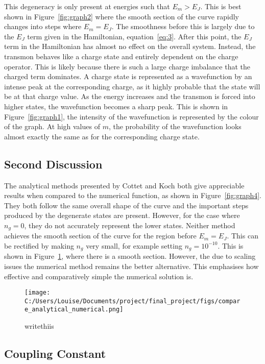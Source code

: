 \documentclass[11pt]{article}
\begin{document}
This degeneracy is only present at energies such that $E_m > E_J$. This is best shown in Figure~\ref{fig:graph2} where the smooth section of the curve rapidly changes into steps where $E_m = E_J$. The smoothness before this is largely due to the $E_J$ term given in the Hamiltonian, equation~\ref{eq:3}. After this point, the $E_J$ term in the Hamiltonian has almost no effect on the overall system. Instead, the transmon behaves like a charge state and entirely dependent on the charge operator. This is likely because there is such a large charge imbalance that the charged term dominates. A charge state is represented as a wavefunction by an intense peak at the corresponding charge, as it highly probable that the state will be at that charge value. As the energy increases and the transmon is forced into higher states, the wavefunction becomes a sharp peak. This is shown in Figure~\ref{fig:graph1}, the intensity of the wavefunction is represented by the colour of the graph. At high values of $m$, the probability of the wavefunction looks almost exactly the same as for the corresponding charge state.

\subsection{Second Discussion}
The analytical methods presented by Cottet and Koch both give appreciable results when compared to the numerical function, as shown in Figure~\ref{fig:graph4}. They both follow the same overall shape of the curve and the important steps produced by the degenerate states are present. However, for the case where $n_g = 0$, they do not accurately represent the lower states. Neither method achieves the smooth section of the curve for the region before $E_m = E_J$. This can be rectified by making $n_g$ very small, for example setting $n_g = 10^{-10}$. This is shown in Figure~\ref{fig:graph6}, where there is a smooth section. However, the due to scaling issues the numerical method remains the better alternative. This emphasises how effective and comparatively simple the numerical solution is.

\begin{figure}[ht]
\centering
\texttt{[image: C:/Users/Louise/Documents/project/final\_project/figs/compare\_analytical\_numerical.png]}
\caption{writethiis}
\label{fig:graph6}
\end{figure}



\subsection{Coupling Constant}
\end{document}

